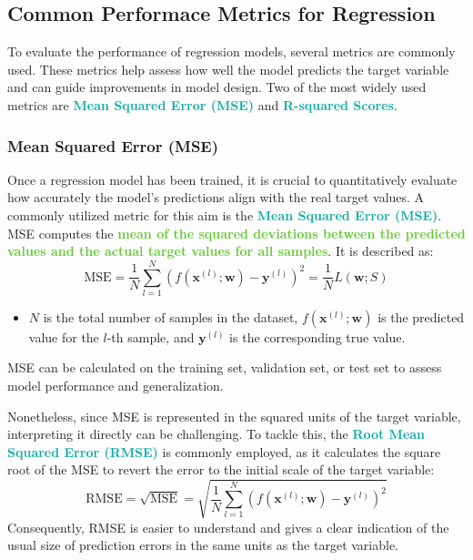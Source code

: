 \documentclass[twoside]{article}
\newcommand{\highlightbluetext}[1]{\textcolor[HTML]{09ACA6}{\textbf{#1}}}
\newcommand{\highlightgreentext}[1]{\textcolor[HTML]{62C92F}{\textbf{#1}}}
\numberwithin{equation}{section}
\begin{document}
	\subsection{Common Performace Metrics for Regression}
	\label{subsec:CommonPerformanceMetricsForRegression}
	To evaluate the performance of regression models, several metrics are commonly used. These metrics help assess how well the model predicts the target variable and can guide improvements in model design. Two of the most widely used metrics are \highlightbluetext{Mean Squared Error (MSE)} and \highlightbluetext{R-squared Scores}.

	\subsubsection{Mean Squared Error (MSE)}
	\label{subsubsec:MeanSquaredError}
	Once a regression model has been trained, it is crucial to quantitatively evaluate how accurately the model's predictions align with the real target values. A commonly utilized metric for this aim is the \highlightbluetext{Mean Squared Error (MSE)}. MSE computes the \highlightgreentext{mean of the squared deviations between the predicted values and the actual target values for all samples}. It is described as:
	\begin{equation}
	\label{eq:MeanSquaredErrorDefinition}
		\boxed{\text{MSE} = \frac{1}{N} \sum_{l = 1}^{N} \left( f(\mathbf{x}^{(l)}; \mathbf{w}) - \mathbf{y}^{(l)} \right)^2 = \frac{1}{N} L(\mathbf{w}; S)}
	\end{equation}
	\begin{itemize}
		\item $N$ is the total number of samples in the dataset, $f(\mathbf{x}^{(l)}; \mathbf{w})$ is the predicted value for the $l$-th sample, and $\mathbf{y}^{(l)}$ is the corresponding true value.
	\end{itemize}
	MSE can be calculated on the training set, validation set, or test set to assess model performance and generalization.

	Nonetheless, since MSE is represented in the squared units of the target variable, interpreting it directly can be challenging. To tackle this, the \highlightbluetext{Root Mean Squared Error (RMSE)} is commonly employed, as it calculates the square root of the MSE to revert the error to the initial scale of the target variable:
	\begin{equation}
	\label{eq:RootMeanSquaredErrorDefinition}
		\boxed{\text{RMSE} = \sqrt{\text{MSE}} = \sqrt{\frac{1}{N} \sum_{l = 1}^{N} \left( f(\mathbf{x}^{(l)}; \mathbf{w}) - \mathbf{y}^{(l)} \right)^2}}
	\end{equation}
	Consequently, RMSE is easier to understand and gives a clear indication of the usual size of prediction errors in the same units as the target variable.
\end{document}
